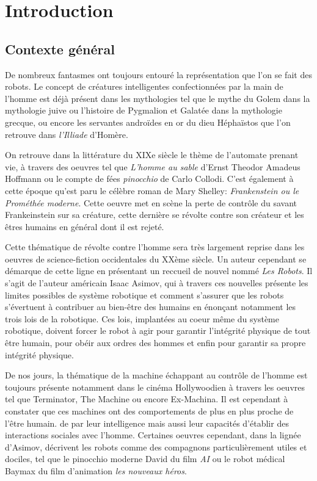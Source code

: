 \documentclass[a4paper,11pt,twoside]{StyleThese}
\begin{document}
\fi


\chapter*{Introduction}
\minitoc

\section{Contexte général}
De nombreux fantasmes ont toujours entouré la représentation que l'on se fait des robots. Le concept de créatures intelligentes confectionnées par la main de l'homme est déjà présent dans les mythologies tel que le mythe du Golem dans la mythologie juive ou l'histoire de Pygmalion et Galatée dans la mythologie grecque, ou encore les servantes androïdes en or du dieu Héphaïstos que l'on retrouve dans \textit{l'Illiade} d'Homère.

On retrouve dans la littérature du XIXe siècle le thème de l'automate prenant vie, à travers des oeuvres tel que \textit{L'homme au sable} d'Ernst Theodor Amadeus Hoffmann ou le compte de fées \textit{pinocchio} de Carlo Collodi. C'est également à cette époque qu'est paru le célèbre roman de Mary Shelley: \textit{Frankenstein ou le Prométhée moderne}. Cette oeuvre met en scène la perte de contrôle du savant Frankeinstein sur sa créature, cette dernière se révolte contre son créateur et les êtres humains en général dont il est rejeté. 

Cette thématique de révolte contre l'homme sera très largement reprise dans les oeuvres de science-fiction occidentales du XXème siècle. Un auteur cependant se démarque de cette ligne en présentant un reccueil de nouvel nommé \textit{Les Robots}. Il s'agit de l'auteur américain Isaac Asimov, qui à travers ces nouvelles présente les limites possibles de système robotique et comment s'assurer que les robots s'évertuent à contribuer au bien-être des humains en énonçant notamment les trois lois de la robotique. Ces lois, implantées au coeur même du système robotique, doivent forcer le robot à agir pour garantir l'intégrité physique de tout être humain, pour obéir aux ordres des hommes et enfin pour garantir sa propre intégrité physique.

De nos jours, la thématique de la machine échappant au contrôle de l'homme est toujours présente notamment dans le cinéma Hollywoodien à travers les oeuvres tel que Terminator, The Machine ou encore Ex-Machina. Il est cependant à constater que ces machines ont des comportements de plus en plus proche de l'être humain.  de par leur intelligence mais aussi leur capacités d'établir des interactions sociales  avec l'homme.
Certaines oeuvres cependant, dans la lignée d'Asimov, décrivent les robots comme des compagnons particulièrement utiles et dociles, tel que le pinocchio moderne David du film \textit{AI} ou le robot médical Baymax du film d'animation \textit{les nouveaux héros}.
\end{document}
